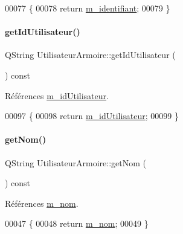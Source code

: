 \begin{DoxyCode}
00077 \{
00078     \textcolor{keywordflow}{return} \hyperlink{class_utilisateur_armoire_a30cb02e16dd9085a70c6b436781bb756}{m\_identifiant};
00079 \}
\end{DoxyCode}
\mbox{\label{class_utilisateur_armoire_a6a37ddd972e4de9db1cf3b4caa1d1755}} 
\paragraph{\texorpdfstring{get\+Id\+Utilisateur()}{getIdUtilisateur()}}
{\footnotesize\ttfamily Q\+String Utilisateur\+Armoire\+::get\+Id\+Utilisateur (\begin{DoxyParamCaption}{ }\end{DoxyParamCaption}) const}



Références \hyperlink{class_utilisateur_armoire_a7e3072a1a336d5ee1cf87c81d27b11e0}{m\+\_\+id\+Utilisateur}.


\begin{DoxyCode}
00097 \{
00098     \textcolor{keywordflow}{return} \hyperlink{class_utilisateur_armoire_a7e3072a1a336d5ee1cf87c81d27b11e0}{m\_idUtilisateur};
00099 \}
\end{DoxyCode}
\mbox{\label{class_utilisateur_armoire_a0c7b68d55b8a929a2522cc693b8e250a}} 
\paragraph{\texorpdfstring{get\+Nom()}{getNom()}}
{\footnotesize\ttfamily Q\+String Utilisateur\+Armoire\+::get\+Nom (\begin{DoxyParamCaption}{ }\end{DoxyParamCaption}) const}



Références \hyperlink{class_utilisateur_armoire_a39e1227fe3c7d726b161acab6a5c3434}{m\+\_\+nom}.


\begin{DoxyCode}
00047 \{
00048     \textcolor{keywordflow}{return} \hyperlink{class_utilisateur_armoire_a39e1227fe3c7d726b161acab6a5c3434}{m\_nom};
00049 \}
\end{DoxyCode}
\mbox{\label{class_utilisateur_armoire_a714ef42e6907cf73312a55b7f896682a}} 
